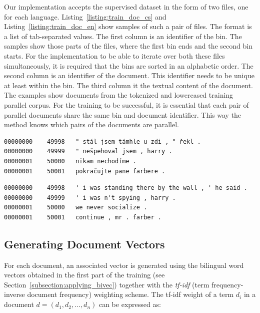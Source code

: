 Our implementation accepts the supervised dataset in the form of two files, one for each language. Listing~\ref{listing:train_doc_cs} and Listing~\ref{listing:train_doc_en} show samples of such a pair of files. The format is a list of tab-separated values. The first column is an identifier of the bin. The samples show those parts of the files, where the first bin ends and the second bin starts. For the implementation to be able to iterate over both these files simultaneously, it is required that the bins are sorted in an alphabetic order. The second column is an identifier of the document. This identifier needs to be unique at least within the bin. The third column it the textual content of the document. The examples show documents from the tokenized and lowercased training parallel corpus. For the training to be successful, it is essential that each pair of parallel documents share the same bin and document identifier. This way the method knows which pairs of the documents are parallel.

\begin{lstlisting}[float=!htb,caption={Sample from a file with Czech documents (training)},label={listing:train_doc_cs},firstnumber=49999]
00000000	49998	" stál jsem támhle u zdi , " řekl .
00000000	49999	" nešpehoval jsem , harry .
00000001	50000	nikam nechodíme .
00000001	50001	pokračujte pane farbere .
\end{lstlisting}
	
\begin{lstlisting}[float=!htb,caption={Sample from a file with English documents (training)},label={listing:train_doc_en},firstnumber=49999]
00000000	49998	' i was standing there by the wall , ' he said .
00000000	49999	' i was n't spying , harry .
00000001	50000	we never socialize .
00000001	50001	continue , mr . farber .
\end{lstlisting}

\subsection{Generating Document Vectors}
\label{subsection:generating_document_vectors}

For each document, an associated vector is generated using the bilingual word vectors obtained in the first part of the training (see Section~\ref{subsection:applying_bivec}) together with the \textit{tf-idf} (term frequency-inverse document frequency) weighting scheme. The tf-idf weight of a term $d_i$ in a document $d=(d_1, d_2, \ldots,d_n)$ can be expressed as:

